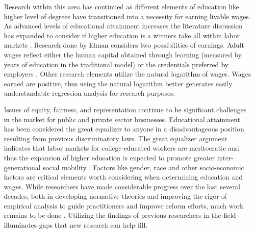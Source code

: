 \documentclass[12pt, English]{article}
\begin{document}
Research within this area has continued as different elements of education like higher level of degrees have transitioned into a necessity for earning livable wages. As advanced levels of educational attainment increases the literature discussion has expanded to consider if higher education is a winners take all within labor markets \citep{elman2004race}. Research done by Elman considers two possibilities of earnings. Adult wages reflect either the human capital obtained through learning (measured by years of education
in the traditional model) or the credentials preferred by employers \citep{elman2004race}. Other research elements utilize the natural logarithm of wages. Wages earned are positive, thus using the natural logarithm better generates easily understandable regression analysis for research purposes. 

Issues of equity, fairness, and representation continue to be significant challenges in the market for public and private sector businesses. Educational attainment has been considered the great equalizer to anyone in a disadvantageous position resulting from previous discriminatory laws. The great equalizer argument indicates that labor markets for college-educated workers are meritocratic and thus the expansion of higher education is expected to promote greater inter-generational social mobility \citep{long2010changes}. Factors like gender, race and other socio-economic factors are critical elements worth considering when determining education and wages. While researchers have made considerable progress over the last several decades, both in developing normative theories and improving the rigor of empirical analysis to guide practitioners and improve reform efforts, much work remains to be done \citep{rabovsky2018exploring}. Utilizing the findings of previous researchers in the field illuminates gaps that new research can help fill. 
\end{document}
